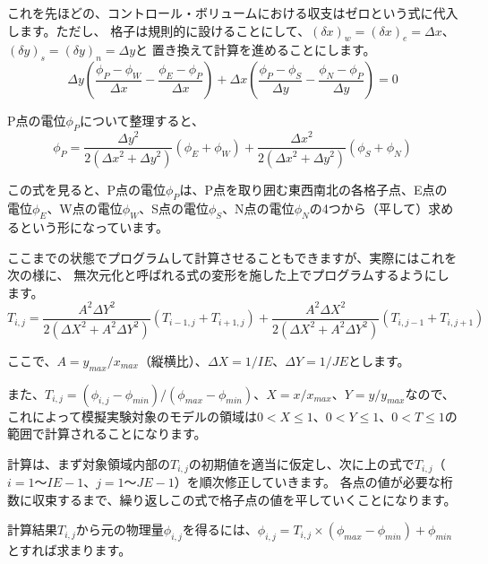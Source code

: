 \documentclass[uplatex,a4paper,11pt,oneside,openany]{jsbook}
\begin{document}
これを先ほどの、コントロール・ボリュームにおける収支はゼロという式に代入します。ただし、
格子は規則的に設けることにして、$(\delta x)_{w}=(\delta x)_{e}=\varDelta x$、$(\delta y)_{s}=(\delta y)_{n}=\varDelta y$と
置き換えて計算を進めることにします。
\begin{equation*}
  \varDelta y(\frac{\phi_{P}-\phi_{W}}{\varDelta x}-\frac{\phi_{E}-\phi_{P}}{\varDelta x})+\varDelta x(\frac{\phi_{P}-\phi_{S}}{\varDelta y}-\frac{\phi_{N}-\phi_{P}}{\varDelta y})=0
\end{equation*}

P点の電位$\phi_{P}$について整理すると、
\begin{equation*}
  \phi_{P}=\frac{{\varDelta y}^2}{2({\varDelta x}^2+{\varDelta y}^2)}(\phi_{E}+\phi_{W})+
  \frac{{\varDelta x}^2}{2({\varDelta x}^2+{\varDelta y}^2)}(\phi_{S}+\phi_{N})
\end{equation*}

この式を見ると、P点の電位$\phi_{P}$は、P点を取り囲む東西南北の各格子点、E点の電位$\phi_{E}$、W点の電位$\phi_{W}$、S点の電位$\phi_{S}$、N点の電位$\phi_{N}$の4つから（平して）求めるという形になっています。

ここまでの状態でプログラムして計算させることもできますが、実際にはこれを次の様に、
無次元化と呼ばれる式の変形を施した上でプログラムするようにします。\cite{2}
\begin{equation*}
  T_{i,j} = \frac{A^2 {\varDelta Y}^2}{2({\varDelta X}^2+A^2 {\varDelta Y}^2)} (T_{i-1,j}+T_{i+1,j})+
          \frac{A^2 {\varDelta X}^2}{2({\varDelta X}^2+A^2 {\varDelta Y}^2)}(T_{i,j-1}+T_{i,j+1})
\end{equation*}

ここで、$A=y_{max}/x_{max}$（縦横比）、$\varDelta X=1/IE$、$\varDelta Y=1/JE$とします。

また、$T_{i,j}=(\phi_{i,j}-\phi_{min})/(\phi_{max}-\phi_{min})$、$X=x/x_{max}$、$Y=y/y_{max}$なので、
これによって模擬実験対象のモデルの領域は$0<X\le1$、$0<Y\le1$、$0<T\le1$の範囲で計算されることになります。

計算は、まず対象領域内部の$T_{i,j}$の初期値を適当に仮定し、次に上の式で$T_{i,j}$（$i=1〜IE-1$、$j=1〜JE-1$）を順次修正していきます。
各点の値が必要な桁数に収束するまで、繰り返しこの式で格子点の値を平していくことになります。

計算結果$T_{i,j}$から元の物理量$\phi_{i,j}$を得るには、$\phi_{i,j}=T_{i,j}\times(\phi_{max}-\phi_{min})+\phi_{min}$とすれば求まります。


\end{document}
